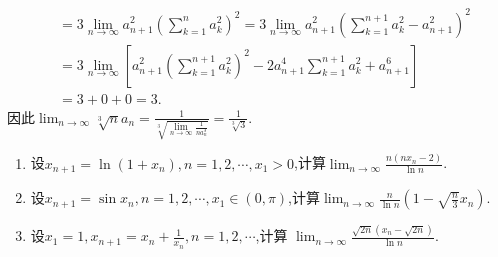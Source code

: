 \documentclass[../../main.tex]{subfiles}
\begin{document}
\begin{solution}
\begin{align*}
&=3\lim_{n\rightarrow\infty}a_{n + 1}^{2}\left(\sum\limits_{k = 1}^n{a_{k}^{2}}\right)^2=3\lim_{n\rightarrow\infty}a_{n + 1}^{2}\left(\sum\limits_{k = 1}^{n + 1}{a_{k}^{2}}-a_{n + 1}^{2}\right)^2\\
&=3\lim_{n\rightarrow\infty}\left[a_{n + 1}^{2}\left(\sum\limits_{k = 1}^{n + 1}{a_{k}^{2}}\right)^2 - 2a_{n + 1}^{4}\sum\limits_{k = 1}^{n + 1}{a_{k}^{2}}+a_{n + 1}^{6}\right]\\
&=3 + 0 + 0 = 3.
\end{align*}
因此\(\lim_{n\rightarrow\infty}\sqrt[3]{n}a_n=\frac{1}{\sqrt[3]{\lim\limits_{n\rightarrow\infty}\frac{1}{na_{n}^{3}}}}=\frac{1}{\sqrt[3]{3}}\).

\end{solution}

\begin{example}
\begin{enumerate}
\item 设\(x_{n + 1} = \ln(1 + x_n), n = 1, 2, \cdots, x_1 > 0\),计算\(\lim_{n \to \infty} \frac{n(nx_n - 2)}{\ln n}\).

\item 设\(x_{n + 1} = \sin x_n, n = 1, 2, \cdots, x_1 \in (0, \pi)\),计算\(\lim_{n \to \infty} \frac{n}{\ln n}(1 - \sqrt{\frac{n}{3}}x_n)\).

\item 设\(x_1 = 1, x_{n + 1} = x_n + \frac{1}{x_n}, n = 1, 2, \cdots\),计算
\(\lim_{n \to \infty} \frac{\sqrt{2n}(x_n - \sqrt{2n})}{\ln n}\).
\end{enumerate}
\end{example}
\end{document}

